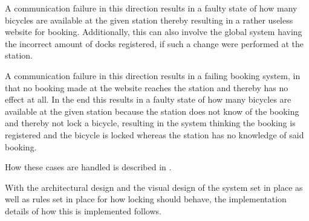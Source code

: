 \begin{description}[style=nextline]
\item[Station to Global System]
A communication failure in this direction results in a faulty state of how many bicycles are available at the given station thereby resulting in a rather useless website for booking.
Additionally, this can also involve the global system having the incorrect amount of docks registered, if such a change were performed at the station.
\item[Global System to Station]
A communication failure in this direction results in a failing booking system, in that no booking made at the website reaches the station and thereby has no effect at all.
In the end this results in a faulty state of how many bicycles are available at the given station because the station does not know of the booking and thereby not lock a bicycle, resulting in the system thinking the booking is registered and the bicycle is locked whereas the station has no knowledge of said booking.
\end{description}


How these cases are handled is described in .

With the architectural design and the visual design of the system set in place as well as rules set in place for how locking should behave, the implementation details of how this is implemented follows.
